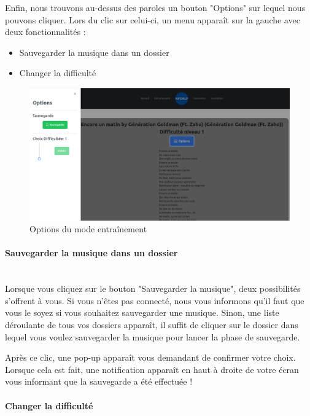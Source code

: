 \documentclass[12pt,french]{article}
\begin{document}
Enfin, nous trouvons au-dessus des paroles un bouton "Options" sur lequel nous pouvons cliquer. Lors du clic sur celui-ci, un menu apparaît sur la gauche avec deux fonctionnalités :

\begin{itemize}
	\item Sauvegarder la musique dans un dossier
	\item Changer la difficulté
\end{itemize}

\bigskip

\begin{figure}[H]
	\centering
	\includegraphics[scale=0.25]{optionparole.png}
	\caption{Options du mode entraînement}
\end{figure}

\paragraph{Sauvegarder la musique dans un dossier \\\\}

Lorsque vous cliquez sur le bouton "Sauvegarder la musique", deux possibilités s'offrent à vous. Si vous n'êtes pas connecté, nous vous informons qu'il faut que vous le soyez si vous souhaitez sauvegarder une musique. Sinon, une liste déroulante de tous vos dossiers apparaît, il suffit de cliquer sur le dossier dans lequel vous voulez sauvegarder la musique pour lancer la phase de sauvegarde.

Après ce clic, une pop-up apparaît vous demandant de confirmer votre choix. Lorsque cela est fait, une notification apparaît en haut à droite de votre écran vous informant que la sauvegarde a été effectuée !

\paragraph{Changer la difficulté \\\\}
\end{document}
